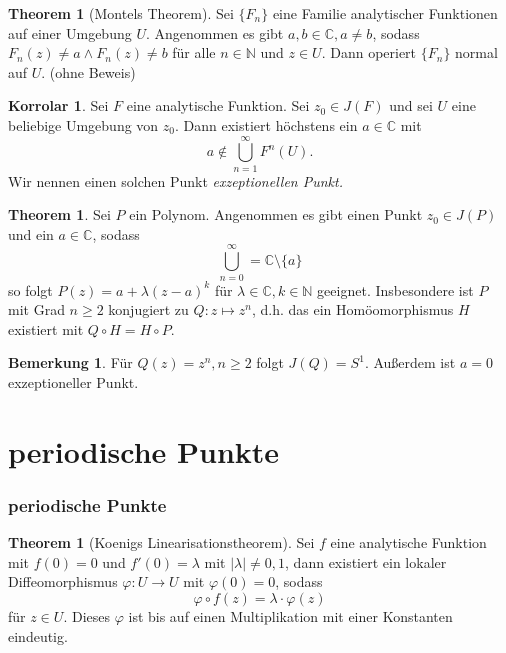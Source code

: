 \documentclass{beamer}
\renewcommand{\phi}{\varphi}
\newcommand{\C}{\mathbb{C}}
\newcommand{\N}{\mathbb{N}}
\theoremstyle{definition}
\newcounter{foo}
\newtheorem{thm}[foo]{Theorem}
\newtheorem{kor}[foo]{Korrolar}
\newtheorem{bem}[foo]{Bemerkung}
\begin{document}
\begin{frame}
\begin{thm}[Montels Theorem]
Sei $\{F_n\}$ eine Familie analytischer Funktionen auf einer Umgebung $U$. Angenommen es gibt $a,b \in \C, a\neq b$, sodass $F_n(z)\neq a \land F_n(z)\neq b$ für alle $n\in \N$ und $z\in U$. Dann operiert $\{F_n\}$ normal auf $U$. (ohne Beweis) 
\end{thm}

\begin{kor}
Sei $F$ eine analytische Funktion. Sei $z_0\in J(F)$ und sei $U$ eine beliebige Umgebung von $z_0$. Dann existiert höchstens ein $a\in \C$ mit
\[
	a\not\in \bigcup_{n=1}^\infty F^n(U).
\]
Wir nennen einen solchen Punkt \emph{exzeptionellen Punkt.}
\end{kor}
\end{frame}

\begin{frame}
\begin{thm}
Sei $P$ ein Polynom. Angenommen es gibt einen Punkt $z_0\in J(P)$ und ein $a\in \C$, sodass 
\[
\bigcup_{n=0}^\infty=\C\setminus\{a\}
\]
so folgt $P(z)=a+\lambda(z-a)^k$ für $\lambda \in \C, k\in \N$ geeignet. 
Insbesondere ist $P$ mit Grad $n\ge 2$ konjugiert zu $Q: z \mapsto z^n$, d.h. 
das ein Homöomorphismus $H$ existiert mit $Q\circ H=H\circ P$.
\end{thm}
\begin{bem}
Für $Q(z)=z^n, n\ge 2$ folgt $J(Q)=S^1$. Außerdem ist $a=0$ exzeptioneller Punkt.
\end{bem}
\end{frame}

\section{periodische Punkte}
\begin{frame}
\frametitle{periodische Punkte}
\begin{thm}[Koenigs Linearisationstheorem]
Sei $f$ eine analytische Funktion mit $f(0)=0$ und $f'(0)=\lambda$ mit 
$|\lambda|\neq0,1$, dann existiert ein lokaler Diffeomorphismus $\phi: U\to U$ mit 
$\phi(0)=0$, sodass 
\[
\phi \circ f(z)=\lambda\cdot \phi(z)
\] 
für $z\in U$. Dieses $\phi$ ist bis auf einen Multiplikation mit einer Konstanten eindeutig.
\end{thm}
\end{frame}
\end{document}
